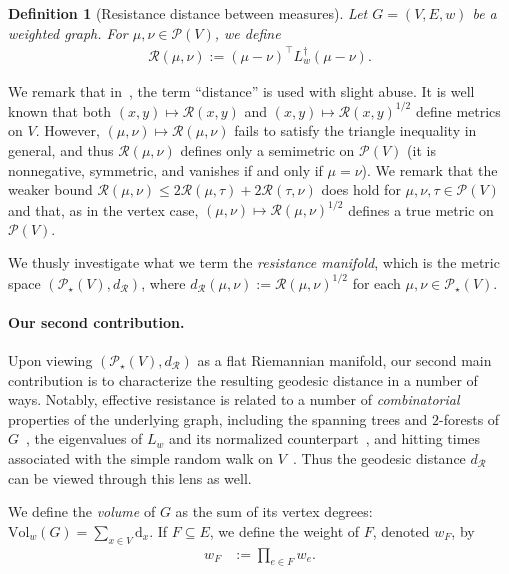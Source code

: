 \documentclass[11pt,a4paper]{article}
\newcommand{\Resis}{\mathcal{R}}
\newcommand{\Prob}{\mathscr{P}}
\newcommand{\Deg}{\mathrm{d}}
\newcommand{\Vol}{\mathrm{Vol}}
\newtheorem{definition}[theorem]{Definition}
\begin{document}
\begin{definition}[Resistance distance between measures]\label{defn:resistance-distance-measures}
    Let $G=(V,E,w)$ be a weighted graph. For $\mu,\nu\in\Prob(V)$, we define
        \begin{align*}
            \Resis (\mu,\nu) := (\mu-\nu)^\top L_{w}^\dagger (\mu-\nu).
        \end{align*}
\end{definition}

We remark that in~, the term ``distance'' is used with slight abuse. It is well known that both $(x,y)\mapsto \Resis(x,y)$ and $(x,y)\mapsto \Resis(x,y)^{1/2}$ define metrics on $V$. However, $(\mu,\nu)\mapsto \Resis (\mu,\nu)$ fails to satisfy the triangle inequality in general, and thus $\Resis (\mu,\nu)$ defines only a semimetric on $\Prob(V)$ (it is nonnegative, symmetric, and vanishes if and only if $\mu=\nu$). We remark that the weaker bound $\Resis (\mu,\nu)\le 2\Resis (\mu,\tau) + 2\Resis (\tau,\nu)$ does hold for $\mu,\nu,\tau\in\Prob(V)$ and that, as in the vertex case, $(\mu,\nu)\mapsto \Resis(\mu,\nu)^{1/2}$ defines a true metric on $\Prob(V)$. 

We thusly investigate what we term the \emph{resistance manifold}, which is the metric space $(\Prob_\star(V),d_{\Resis})$, where $d_\Resis(\mu,\nu) := \Resis(\mu,\nu)^{1/2}$ for each $\mu,\nu\in\Prob_\star(V)$. 

\paragraph{Our second contribution.}
Upon viewing $(\Prob_\star(V),d_{\Resis})$ as a flat Riemannian manifold, our second main contribution is to characterize the resulting geodesic distance in a number of ways.  Notably, effective resistance is related to a number of \emph{combinatorial} properties of the underlying graph, including the spanning trees and $2$-forests of $G$~\cite{chaiken1982combinatorial,barrett2020spanning}, the eigenvalues of $L_{w}$ and its normalized counterpart~\cite{chen2007resistance}, and hitting times associated with the simple random walk on $V$~\cite{tetali1991random,lovasz1995mixing}. Thus the geodesic distance $d_{\Resis}$ can be viewed through this lens as well.

We define the \emph{volume} of $G$ as the sum of its vertex degrees: $\Vol_{w}(G) = \sum_{x\in V} \Deg_{x}$. If $F\subseteq E$, we define the weight of $F$, denoted $w_F$, by 
    \begin{align*}
        w_F &:= \prod_{e\in F} w_e.
    \end{align*}
\end{document}
